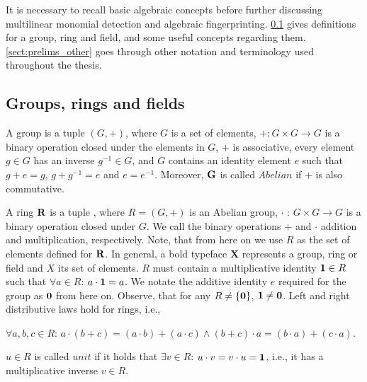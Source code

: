 It is necessary to recall basic algebraic concepts 
before further discussing multilinear monomial detection and algebraic fingerprinting. 
\cref{sect:prelims_algebra} gives definitions for a group, ring and field, 
and some useful concepts regarding them. 
\cref{sect:prelims_other} goes through other notation and terminology used 
throughout the thesis.

\subsection{Groups, rings and fields} %
\label{sect:prelims_algebra}

A group 
is a tuple $(G, +)$, where $G$ is a set of elements,
$+ \colon G \times G \to G$
is a binary operation closed under 
the elements in $G$, $+$ is associative, every element $g\in G$ has an inverse $g^{-1}\in G$, and $G$ contains 
an identity element $e$ such that $g + e = g$, $g + g^{-1} = e$ and $e = e^{-1}$. Moreover, $\textbf G$ is called $Abelian$ if 
$+$ is also commutative.

A ring $\textbf R$ is a tuple
,
where $R = (G, +)$ is an Abelian group, $\cdot$ : $G \times G \longrightarrow G$ 
is a binary operation closed under $G$. We call the binary operations $+$ and
$\cdot$
addition and multiplication, respectively. 
Note, that from here on we use $R$ as the set of elements defined for $\textbf R$. 
In general, a bold typeface \textbf X represents a group, ring or field and $X$ its set of elements. 
$R$ must contain a multiplicative identity $\textbf 1 \in R$ such that $\forall a \in R$: $a \cdot \textbf 1 = a$. 
We notate the additive identity $e$ required for the group as $\textbf 0$ from here on. 
Observe, that for any $R \neq \{\textbf 0\}$, $\textbf 1 \neq \textbf 0$.  
Left and right distributive laws hold for rings, i.e., 
\begin{center}
  $\forall a, b, c \in R$: $a \cdot (b + c) = (a \cdot b) + (a \cdot c) \land (b + c) \cdot a = (b \cdot a) + (c \cdot a)$.
\end{center}
$u \in R$ is called $unit$ if it holds that $\exists v \in R$: $u \cdot v = v \cdot u = \textbf 1$, 
i.e., it has a multiplicative inverse $v \in R$.

